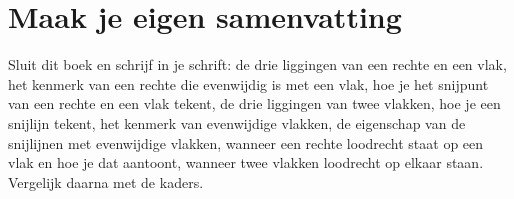 \ifzelfstudie
\section*{Maak je eigen samenvatting}
Sluit dit boek en schrijf in je schrift: de drie liggingen van een rechte en een vlak, het kenmerk van een rechte die evenwijdig is met een vlak, hoe je het snijpunt van een rechte en een vlak tekent, de drie liggingen van twee vlakken, hoe je een snijlijn tekent, het kenmerk van evenwijdige vlakken, de eigenschap van de snijlijnen met evenwijdige vlakken, wanneer een rechte loodrecht staat op een vlak en hoe je dat aantoont, wanneer twee vlakken loodrecht op elkaar staan. Vergelijk daarna met de kaders.
\fi
